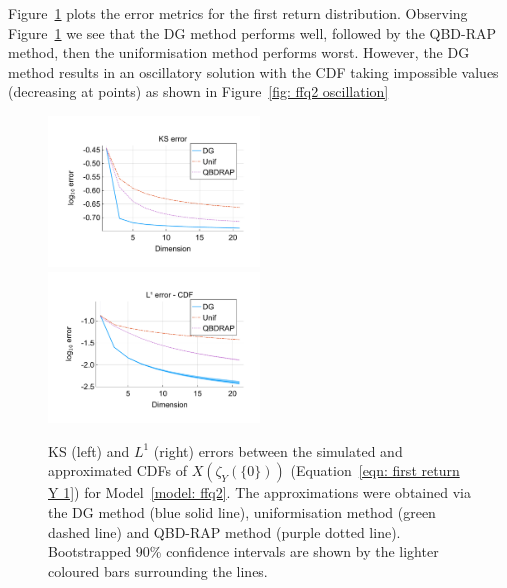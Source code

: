 Figure~\ref{fig: ffq return discts} plots the error metrics for the first return distribution. Observing Figure~\ref{fig: ffq return discts} we see that the DG method performs well, followed by the QBD-RAP method, then the uniformisation method performs worst. However, the DG method results in an oscillatory solution with the CDF taking impossible values (decreasing at points) as shown in Figure~\ref{fig: ffq2 oscillation}
\begin{figure}[h]
	\centering
	\includegraphics[width=0.5\textwidth,trim={0.75cm 0.8cm 0.25cm 1.25cm},clip]{chapter6/figs/ffq/discts/ks_error_formatted.pdf}%
	\includegraphics[width=0.5\textwidth,trim={0.75cm 0.8cm 0.25cm 1.25cm},clip]{chapter6/figs/ffq/discts/l1_cdf_error_formatted.pdf}
	\caption{KS (left) and \(L^1\) (right) errors between the simulated and approximated CDFs of \(X(\zeta_{Y}(\{0\}))\) (Equation~\ref{eqn: first return Y 1}) for Model~\ref{model: ffq2}. The approximations were obtained via the DG method (blue solid line), uniformisation method (green dashed line) and QBD-RAP method (purple dotted line). Bootstrapped 90\% confidence intervals are shown by the lighter coloured bars surrounding the lines.} 
	\label{fig: ffq return discts} 
\end{figure} 

